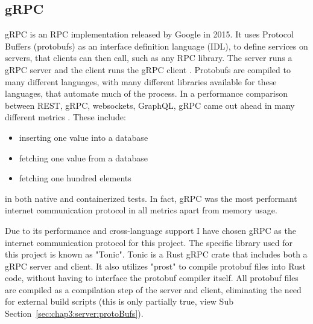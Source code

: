 \subsection{gRPC} \label{sec:chap3:technology:grpc}
gRPC is an RPC implementation released by Google in 2015. It uses Protocol Buffers (protobufs) as an interface definition language (IDL), to define services on servers, that clients can then call, such as any RPC library. The server runs a gRPC server and the client runs the gRPC client \cite{grpcHomepage}. Protobufs are compiled to many different languages, with many different libraries available for these languages, that automate much of the process. In a performance comparison between REST, gRPC, websockets, GraphQL, gRPC came out ahead in many different metrics \cite{reviewOfInternetProtocols}. These include: 
\begin{itemize}
    \item inserting one value into a database
    \item fetching one value from a database 
    \item fetching one hundred elements  
\end{itemize}
in both native and containerized tests. In fact, gRPC was the most performant internet communication protocol in all metrics apart from memory usage.

Due to its performance and cross-language support I have chosen gRPC as the internet communication protocol for this project. The specific library used for this project is known as "Tonic". Tonic is a Rust gRPC crate that includes both a gRPC server and client. It also utilizes "prost" to compile protobuf files into Rust code, without having to interface the protobuf compiler itself. All protobuf files are compiled as a compilation step of the server and client, eliminating the need for external build scripts (this is only partially true, view Sub Section~\ref{sec:chap3:server:protoBufs}).

